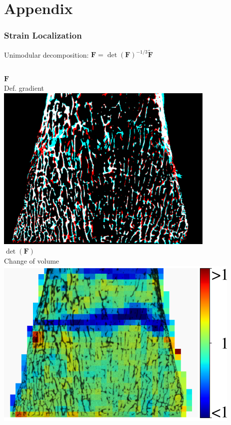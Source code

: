\documentclass[xcolor=table,11pt]{beamer}
\begin{document}
	\appendix
	
	\section{Appendix}

	\begin{frame}
		\frametitle{Strain Localization}
		Unimodular decomposition: $\mathbf{F} = \det(\mathbf{F})^{-1/3}\tilde{\mathbf{F}}$
		
		\vfill

		\begin{columns}
			\centering
			$\mathbf{F}$\\
			\vfill
			Def. gradient\\
			\includegraphics[width=\linewidth]{Figures/SL1}\\

			\centering
			$\det(\mathbf{F})$\\
			\vfill
			Change of volume\\
			\includegraphics[width=\linewidth]{Figures/SL2}\\


\end{columns}
\end{frame}
\end{document}
